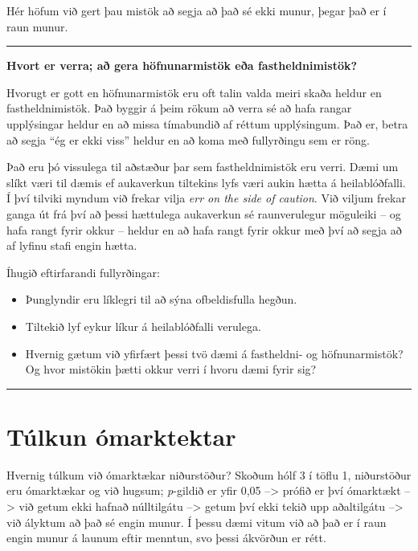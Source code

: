 \documentclass[
]{book}
\begin{document}
Hér höfum við gert þau mistök að segja að það sé ekki munur, þegar það er í raun munur.

\begin{center}\rule{0.5\linewidth}{0.5pt}\end{center}

\textbf{Hvort er verra; að gera höfnunarmistök eða fastheldnimistök?}

Hvorugt er gott en höfnunarmistök eru oft talin valda meiri skaða heldur en fastheldnimistök. Það byggir á þeim rökum að verra sé að hafa rangar upplýsingar heldur en að missa tímabundið af réttum upplýsingum. Það er, betra að segja ``ég er ekki viss'' heldur en að koma með fullyrðingu sem er röng.

Það eru þó vissulega til aðstæður þar sem fastheldnimistök eru verri. Dæmi um slíkt væri til dæmis ef aukaverkun tiltekins lyfs væri aukin hætta á heilablóðfalli. Í því tilviki myndum við frekar vilja \emph{err on the side of caution}. Við viljum frekar ganga út frá því að þessi hættulega aukaverkun sé raunverulegur möguleiki -- og hafa rangt fyrir okkur -- heldur en að hafa rangt fyrir okkur með því að segja að af lyfinu stafi engin hætta.

Íhugið eftirfarandi fullyrðingar:

\begin{itemize}
\item
  Þunglyndir eru líklegri til að sýna ofbeldisfulla hegðun.
\item
  Tiltekið lyf eykur líkur á heilablóðfalli verulega.
\item
  Hvernig gætum við yfirfært þessi tvö dæmi á fastheldni- og höfnunarmistök? Og hvor mistökin þætti okkur verri í hvoru dæmi fyrir sig?
\end{itemize}

\begin{center}\rule{0.5\linewidth}{0.5pt}\end{center}

\hypertarget{tuxfalkun-uxf3marktektar}{%
\section{Túlkun ómarktektar}\label{tuxfalkun-uxf3marktektar}}

Hvernig túlkum við ómarktækar niðurstöður? Skoðum hólf 3 í töflu 1, niðurstöður eru ómarktækar og við hugsum; \emph{p}-gildið er yfir 0,05 --\textgreater{} prófið er því ómarktækt --\textgreater{} við getum ekki hafnað núlltilgátu --\textgreater{} getum því ekki tekið upp aðaltilgátu --\textgreater{} við ályktum að það sé engin munur. Í þessu dæmi vitum við að það er í raun engin munur á launum eftir menntun, svo þessi ákvörðun er rétt.
\end{document}
